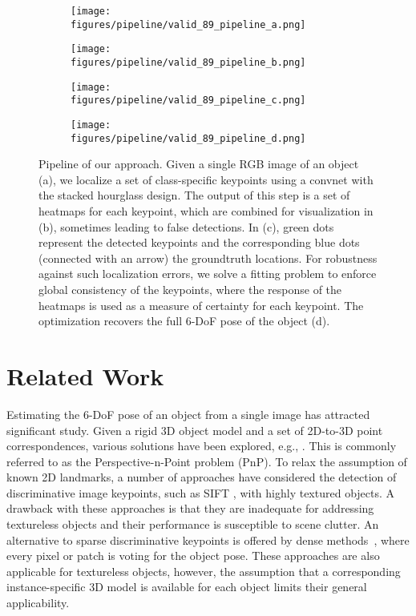 \documentclass[letterpaper, 10 pt, conference]{ieeeconf}
\begin{document}
\begin{figure*}
  \centering
  \begin{subfigure}[b]{0.2\textwidth}
    \texttt{[image: figures/pipeline/valid\_89\_pipeline\_a.png]}
    \caption{}
  \end{subfigure}
  \begin{subfigure}[b]{0.2\textwidth}
  \texttt{[image: figures/pipeline/valid\_89\_pipeline\_b.png]}
  \caption{}
  \end{subfigure}  
  \begin{subfigure}[b]{0.2\textwidth}
  \texttt{[image: figures/pipeline/valid\_89\_pipeline\_c.png]}
  \caption{}
  \end{subfigure}
  \begin{subfigure}[b]{0.2\textwidth}
  \texttt{[image: figures/pipeline/valid\_89\_pipeline\_d.png]}
  \caption{}
 \end{subfigure}  
  \caption{Pipeline of our approach. Given a single RGB image of an object (a), we localize a set of class-specific keypoints using a convnet with the stacked hourglass design. The output of this step is a set of heatmaps for each keypoint, which are combined for visualization in (b), sometimes leading to false detections. In (c), green dots represent the detected keypoints and the corresponding blue dots (connected with an arrow) the groundtruth locations. For robustness against such localization errors, we solve a fitting problem to enforce global consistency of the keypoints, where the response of the heatmaps is used as a measure of certainty for each keypoint. The optimization recovers the full 6-DoF pose of the object (d).}\label{fig:pipeline}
\vspace{-1em}
\end{figure*}
 
\section{Related Work}
Estimating the 6-DoF pose of an object from a single image has attracted significant study. Given a rigid 3D object model and a set of 2D-to-3D point correspondences, various solutions have been explored, e.g., \cite{fischler1981, lepetit2009}. This is commonly referred to as the Perspective-n-Point problem (PnP). To relax the assumption of known 2D landmarks, a number of approaches \cite{collet2009,collet2011,xie2013} have considered the detection of discriminative image keypoints, such as SIFT \cite{lowe2004}, with highly textured objects.  A drawback with these approaches is that they are inadequate for addressing textureless objects and  their performance is susceptible to scene clutter. An alternative to sparse discriminative keypoints is offered by dense methods~\cite{brachmann2014learning,brachmann2016uncertainty,doumanoglou2016recovering,michel2016global}, where every pixel or patch is voting for the object pose. These approaches are also applicable for textureless objects, however, the assumption that a corresponding instance-specific 3D model is available for each object limits their general applicability.
\end{document}
